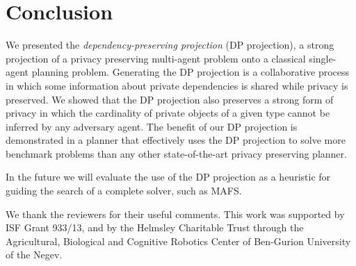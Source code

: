 \documentclass[letterpaper]{article}
\theoremstyle{definition}
\begin{document}
\section{Conclusion}
We presented the {\em dependency-preserving projection} (DP projection), a strong projection of a privacy preserving multi-agent problem onto a classical single-agent planning problem. Generating the DP projection is a collaborative process in which some information about private dependencies is shared while privacy is preserved. We showed that the DP projection also preserves a strong form of privacy in which the cardinality of private objects of a given type cannot be inferred by any adversary agent. The benefit of our DP projection is demonstrated in a planner that effectively uses the DP projection to solve more benchmark problems than any other state-of-the-art privacy preserving planner. 

In the future we will evaluate the use of the DP projection as a heuristic for guiding the search of a complete solver, such as MAFS.

 We thank the reviewers for their useful comments. This work was supported by ISF Grant 933/13, and by the Helmsley Charitable Trust through the Agricultural, Biological and Cognitive Robotics Center of Ben-Gurion University of the Negev.

\end{document}
